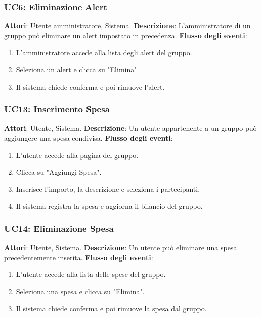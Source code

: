 \subsubsection{UC6: Eliminazione Alert}
\textbf{Attori}: Utente amministratore, Sistema.
\newline
\newline
\textbf{Descrizione}: L’amministratore di un gruppo può eliminare un alert impostato in precedenza.
\newline
\newline
\textbf{Flusso degli eventi}:
\begin{enumerate}
    \item L’amministratore accede alla lista degli alert del gruppo.
    \item Seleziona un alert e clicca su "Elimina".
    \item Il sistema chiede conferma e poi rimuove l’alert.
\end{enumerate}

\subsubsection{UC13: Inserimento Spesa}
\textbf{Attori}: Utente, Sistema.
\newline
\newline
\textbf{Descrizione}: Un utente appartenente a un gruppo può aggiungere una spesa condivisa.
\newline
\newline
\textbf{Flusso degli eventi}:
\begin{enumerate}
    \item L’utente accede alla pagina del gruppo.
    \item Clicca su "Aggiungi Spesa".
    \item Inserisce l’importo, la descrizione e seleziona i partecipanti.
    \item Il sistema registra la spesa e aggiorna il bilancio del gruppo.
\end{enumerate}

\subsubsection{UC14: Eliminazione Spesa}
\textbf{Attori}: Utente, Sistema.
\newline
\newline
\textbf{Descrizione}: Un utente può eliminare una spesa precedentemente inserita.
\newline
\newline
\textbf{Flusso degli eventi}:
\begin{enumerate}
    \item L’utente accede alla lista delle spese del gruppo.
    \item Seleziona una spesa e clicca su "Elimina".
    \item Il sistema chiede conferma e poi rimuove la spesa dal gruppo.
\end{enumerate}

